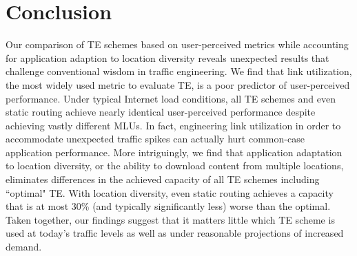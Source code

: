 \section{Conclusion}
\label{sec:conclusion}

Our comparison of TE schemes based on user-perceived metrics while accounting for application adaption to location diversity reveals unexpected results that challenge conventional wisdom in traffic engineering. 
We find that link utilization, the most widely used metric to evaluate TE, is a poor predictor of user-perceived performance. 
Under typical Internet load conditions, all TE schemes and even static routing achieve nearly identical user-perceived performance despite achieving vastly different MLUs.  In fact, engineering link utilization in order to accommodate unexpected traffic spikes  can actually hurt common-case application performance. 
More intriguingly, we find that application adaptation to location diversity, or the ability to download content from multiple locations, eliminates differences in the achieved capacity of all TE schemes including ``optimal" TE. 
With location diversity, even static routing achieves a capacity that is at most 30\% (and typically significantly less) worse than the optimal. Taken together, our findings suggest that it matters little which TE scheme is used at today's traffic levels as well as under reasonable projections of increased demand. 





